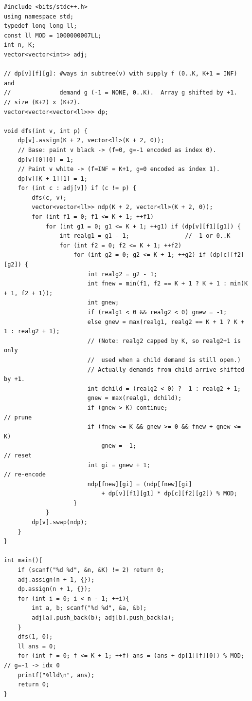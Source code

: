 \begin{lstlisting}[caption={Ostap and Tree -- supply/demand two-index tree DP, capped by $k$, with the $f+g \le k$ reset; count mod $10^9{+}7$ (Codeforces 735E; $O(n k^2)$)}, label={lst:c27-summit}]
#include <bits/stdc++.h>
using namespace std;
typedef long long ll;
const ll MOD = 1000000007LL;
int n, K;
vector<vector<int>> adj;

// dp[v][f][g]: #ways in subtree(v) with supply f (0..K, K+1 = INF) and
//              demand g (-1 = NONE, 0..K).  Array g shifted by +1.
// size (K+2) x (K+2).
vector<vector<vector<ll>>> dp;

void dfs(int v, int p) {
    dp[v].assign(K + 2, vector<ll>(K + 2, 0));
    // Base: paint v black -> (f=0, g=-1 encoded as index 0).
    dp[v][0][0] = 1;
    // Paint v white -> (f=INF = K+1, g=0 encoded as index 1).
    dp[v][K + 1][1] = 1;
    for (int c : adj[v]) if (c != p) {
        dfs(c, v);
        vector<vector<ll>> ndp(K + 2, vector<ll>(K + 2, 0));
        for (int f1 = 0; f1 <= K + 1; ++f1)
            for (int g1 = 0; g1 <= K + 1; ++g1) if (dp[v][f1][g1]) {
                int realg1 = g1 - 1;                // -1 or 0..K
                for (int f2 = 0; f2 <= K + 1; ++f2)
                    for (int g2 = 0; g2 <= K + 1; ++g2) if (dp[c][f2][g2]) {
                        int realg2 = g2 - 1;
                        int fnew = min(f1, f2 == K + 1 ? K + 1 : min(K + 1, f2 + 1));
                        int gnew;
                        if (realg1 < 0 && realg2 < 0) gnew = -1;
                        else gnew = max(realg1, realg2 == K + 1 ? K + 1 : realg2 + 1);
                        // (Note: realg2 capped by K, so realg2+1 is only
                        //  used when a child demand is still open.)
                        // Actually demands from child arrive shifted by +1.
                        int dchild = (realg2 < 0) ? -1 : realg2 + 1;
                        gnew = max(realg1, dchild);
                        if (gnew > K) continue;                        // prune
                        if (fnew <= K && gnew >= 0 && fnew + gnew <= K)
                            gnew = -1;                                // reset
                        int gi = gnew + 1;                             // re-encode
                        ndp[fnew][gi] = (ndp[fnew][gi]
                            + dp[v][f1][g1] * dp[c][f2][g2]) % MOD;
                    }
            }
        dp[v].swap(ndp);
    }
}

int main(){
    if (scanf("%d %d", &n, &K) != 2) return 0;
    adj.assign(n + 1, {});
    dp.assign(n + 1, {});
    for (int i = 0; i < n - 1; ++i){
        int a, b; scanf("%d %d", &a, &b);
        adj[a].push_back(b); adj[b].push_back(a);
    }
    dfs(1, 0);
    ll ans = 0;
    for (int f = 0; f <= K + 1; ++f) ans = (ans + dp[1][f][0]) % MOD;   // g=-1 -> idx 0
    printf("%lld\n", ans);
    return 0;
}
\end{lstlisting}

